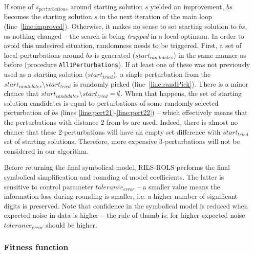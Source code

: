 \documentclass[a4paper,12pt]{elsarticle}
\begin{document}
If some of $s_{perturbations}$ around starting solution $s$ yielded an improvement, $bs$ becomes the starting solution $s$ in the next iteration of the main loop (line~\ref{line:improved}). 
Otherwise, it makes no sense to set starting solution to $bs$, as nothing changed -- the search is being  \emph{trapped} in a local optimum. In order to avoid this undesired situation, randomness needs to be triggered. First, a set of local perturbations around $bs$ is generated ($start_{candidates}$) in the same manner as before (procedure \texttt{All1Perturbations}). If at least one of these was not previously used as a starting solution ($start_{tried}$), a single perturbation from the $start_{candidates} \setminus start_{tried}$ is randomly picked (line~\ref{line:randPick}). There is a minor chance that $start_{candidates} \setminus start_{tried} = \emptyset$. When that happens, the set of starting solution candidates is equal to perturbations of some randomly selected perturbation of $bs$ (lines \ref{line:pert21}-\ref{line:pert22}) -- which effectively means that the perturbations with distance 2 from $bs$ are used. Indeed, there is almost no chance that these 2-perturbations will have an empty set difference with $start_{tried}$ set of starting solutions. Therefore, more expensive 3-perturbations will not be considered in our algorithm. 

Before returning the final symbolical model, \textsc{RILS}-\textsc{ROLS}  performs the final symbolical simplification and rounding of model coefficients. The latter is sensitive to control parameter $tolerance_{error}$ -- a smaller value means the information loss during rounding is smaller, i.e. a higher number of significant digits is preserved. Note that confidence in the symbolical model is reduced when expected noise in data is higher -- the rule of thumb is: for higher expected noise $tolerance_{error}$ should be higher. 

\subsubsection{Fitness function}\label{sec:fitness}
\end{document}

